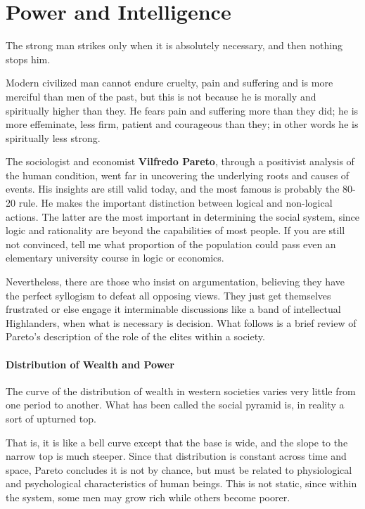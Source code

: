 \section{Power and Intelligence}

\label{sec:PowerIntelligence}

\begin{quotex}
The strong man strikes only when it is absolutely necessary, and then nothing stops him. 

Modern civilized man cannot endure cruelty, pain and suffering and is more merciful than men of the past, but this is not because he is morally and spiritually higher than they. He fears pain and suffering more than they did; he is more effeminate, less firm, patient and courageous than they; in other words he is spiritually less strong. 

\end{quotex}
The sociologist and economist \textbf{Vilfredo Pareto}, through a positivist analysis of the human condition, went far in uncovering the underlying roots and causes of events. His insights are still valid today, and the most famous is probably the 80-20 rule. He makes the important distinction between logical and non-logical actions. The latter are the most important in determining the social system, since logic and rationality are beyond the capabilities of most people. If you are still not convinced, tell me what proportion of the population could pass even an elementary university course in logic or economics.

Nevertheless, there are those who insist on argumentation, believing they have the perfect syllogism to defeat all opposing views. They just get themselves frustrated or else engage it interminable discussions like a band of intellectual Highlanders, when what is necessary is decision. What follows is a brief review of Pareto's description of the role of the elites within a society.

\paragraph{Distribution of Wealth and Power}
\begin{quotex}
The curve of the distribution of wealth in western societies varies very little from one period to another. What has been called the social pyramid is, in reality a sort of upturned top. 

\end{quotex}
That is, it is like a bell curve except that the base is wide, and the slope to the narrow top is much steeper. Since that distribution is constant across time and space, Pareto concludes it is not by chance, but must be related to physiological and psychological characteristics of human beings. This is not static, since within the system, some men may grow rich while others become poorer.

